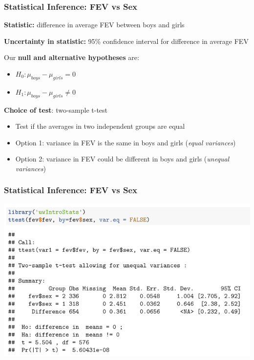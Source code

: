 \documentclass[12pt, 
hyperref={colorlinks=true, linkcolor=blue, urlcolor=cyan}]{beamer}
\begin{document}
\begin{frame}
\frametitle{Statistical Inference: FEV vs Sex}

\textbf{Statistic:} difference in average FEV between boys and girls

\textbf{Uncertainty in statistic:} 95\% confidence interval for difference in average FEV

Our \textbf{null and alternative hypotheses} are: \vspace{-0.3cm}
\begin{itemize}
\item $H_0: \mu_{boys}-\mu_{girls} = 0$
\item $H_1: \mu_{boys}-\mu_{girls} \not= 0$
\end{itemize}

\textbf{Choice of test}: two-sample t-test \vspace{-0.3cm}
\begin{itemize}
\item Test if the averages in two independent groups are equal
\item Option 1: variance in FEV is the same in boys and girls (\textit{equal variances})
\item Option 2: variance in FEV could be different in boys and girls (\textit{unequal variances})
\end{itemize}
\end{frame}

\begin{frame}
\frametitle{Statistical Inference: FEV vs Sex}

\hspace*{-1cm} \includegraphics[width=\paperwidth]{./t-test}

\end{frame}
\end{document}
